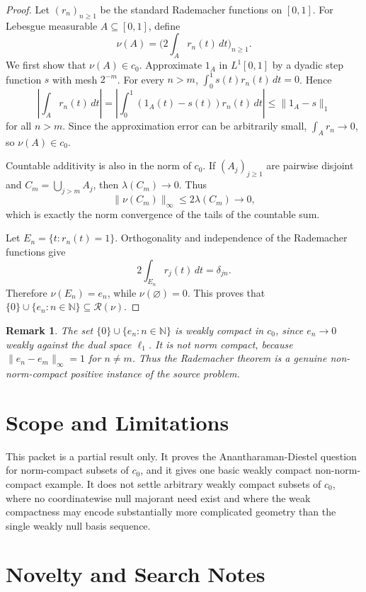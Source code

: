 \documentclass[11pt]{article}
\newtheorem{remark}{Remark}
\newcommand{\N}{\mathbb N}
\newcommand{\Range}{\mathcal R}
\begin{document}
\begin{proof}
Let \((r_n)_{n\ge1}\) be the standard Rademacher functions on \([0,1]\). For
Lebesgue measurable \(A\subseteq[0,1]\), define
\[
\nu(A)=\bigl(2\int_A r_n(t)\,dt\bigr)_{n\ge1}.
\]
We first show that \(\nu(A)\in c_0\). Approximate \(1_A\) in \(L^1[0,1]\) by
a dyadic step function \(s\) with mesh \(2^{-m}\). For every \(n>m\),
\(\int_0^1 s(t)r_n(t)\,dt=0\). Hence
\[
\left|\int_A r_n(t)\,dt\right|
=\left|\int_0^1(1_A(t)-s(t))r_n(t)\,dt\right|
\le \|1_A-s\|_1
\]
for all \(n>m\). Since the approximation error can be arbitrarily small,
\(\int_A r_n\to0\), so \(\nu(A)\in c_0\).

Countable additivity is also in the norm of \(c_0\). If
\((A_j)_{j\ge1}\) are pairwise disjoint and \(C_m=\bigcup_{j>m}A_j\), then
\(\lambda(C_m)\to0\). Thus
\[
\|\nu(C_m)\|_\infty
\le 2\lambda(C_m)\to0,
\]
which is exactly the norm convergence of the tails of the countable sum.

Let \(E_n=\{t:r_n(t)=1\}\). Orthogonality and independence of the Rademacher
functions give
\[
2\int_{E_n}r_j(t)\,dt=\delta_{jn}.
\]
Therefore \(\nu(E_n)=e_n\), while \(\nu(\varnothing)=0\). This proves that
\(\{0\}\cup\{e_n:n\in\N\}\subseteq\Range(\nu)\).
\end{proof}

\begin{remark}
The set \(\{0\}\cup\{e_n:n\in\N\}\) is weakly compact in \(c_0\), since
\(e_n\to0\) weakly against the dual space \(\ell_1\). It is not norm compact,
because \(\|e_n-e_m\|_\infty=1\) for \(n\ne m\). Thus the Rademacher theorem
is a genuine non-norm-compact positive instance of the source problem.
\end{remark}

\section*{Scope and Limitations}

This packet is a partial result only. It proves the Anantharaman-Diestel
question for norm-compact subsets of \(c_0\), and it gives one basic weakly
compact non-norm-compact example. It does not settle arbitrary weakly compact
subsets of \(c_0\), where no coordinatewise null majorant need exist and where
the weak compactness may encode substantially more complicated geometry than
the single weakly null basis sequence.

\section*{Novelty and Search Notes}
\end{document}
